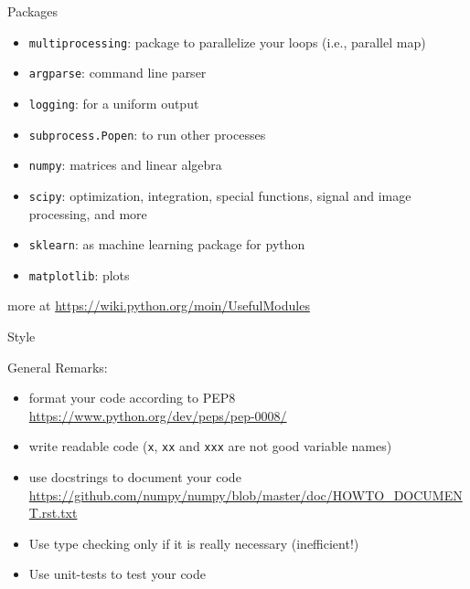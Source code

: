 \documentclass[t,handout]{beamer}
\begin{document}
\begin{frame}[c,fragile]{Packages}

\begin{itemize}
  \item \texttt{multiprocessing}: package to parallelize your loops (i.e., parallel map)
  \item \texttt{argparse}: command line parser
  \item \texttt{logging}: for a uniform output
  \item \texttt{subprocess.Popen}: to run other processes
  \item \texttt{numpy}: matrices and linear algebra
  \item \texttt{scipy}: optimization, integration, special functions, signal and image processing, and more
  \item \texttt{sklearn}: as machine learning package for python
  \item \texttt{matplotlib}: plots
\end{itemize}

\pause

\medskip

more at \url{https://wiki.python.org/moin/UsefulModules}

\end{frame}

\begin{frame}[c,fragile]{Style}

General Remarks:

\begin{itemize}
  \item format your code according to PEP8\\ \url{https://www.python.org/dev/peps/pep-0008/}
  \item write readable code (\texttt{x}, \texttt{xx} and \texttt{xxx} are not good variable names)
  \item use docstrings to document your code\\ \url{https://github.com/numpy/numpy/blob/master/doc/HOWTO_DOCUMENT.rst.txt}
  \item Use type checking only if it is really necessary (inefficient!)
  \item Use unit-tests to test your code
\end{itemize}

\end{frame}
% 
\end{document}
